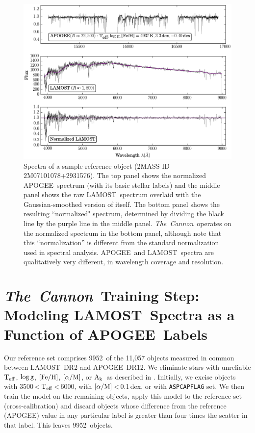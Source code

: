 \documentclass[12pt, letterpaper, preprint]{aastex}
\newcommand{\tc}{\textsl{The~Cannon}}
\newcommand{\apogee}{APOGEE}
\newcommand{\lamost}{LAMOST}
\newcommand{\teff}{\mbox{$\rm T_{eff}$}}
\newcommand{\feh}{\mbox{$\rm [Fe/H]$}}
\newcommand{\alpham}{\mbox{$\rm [\alpha/M]$}}
\newcommand{\logg}{\mbox{$\rm \log g$}}
\newcommand{\ak}{\mbox{$\rm A_k$}}
\newcommand{\ntrobj}{9952}
\begin{document}
\begin{figure}[!p]
\centering
\includegraphics[scale=0.85]{f2.eps}
\caption{Spectra of a sample reference object (2MASS ID 2M07101078+2931576).
The top panel shows the normalized \apogee\ spectrum (with its basic stellar labels) and the middle panel shows
the raw \lamost\ spectrum overlaid with the Gaussian-smoothed version of itself. 
The bottom panel shows the resulting ``normalized" spectrum, determined by
dividing the black line by the purple line in the middle panel. \tc\ operates on the normalized
spectrum in the bottom panel, although note that this ``normalization'' is different from the standard normalization used in spectral analysis. 
\apogee\ and \lamost\ spectra are qualitatively 
very different, in wavelength coverage and resolution.}
\label{fig:sample_spec}
\end{figure}

\section{\tc\ Training Step: \\ Modeling \lamost\ Spectra as a Function of \apogee\ Labels}
\label{sec:training}

Our reference set comprises \ntrobj\ of the 11,057 objects measured in common between \lamost\ DR2 and \apogee\ DR12. 
We eliminate stars with
unreliable \teff, \logg, \feh, \alpham, or \ak\, as described in \citet{Holtzman2015}.
Initially, we excise objects with 3500\,\textless\,\teff\,\textless\,6000, 
with \alpham\,\textless\,0.1\,dex, 
or with \texttt{ASPCAPFLAG} set.
We then train the model on the remaining objects, apply this model
to the reference set (cross-calibration) and discard objects 
whose difference from the reference (\apogee) value
in any particular label is greater than four times the scatter in that label.
This leaves \ntrobj\ objects.
\end{document}
